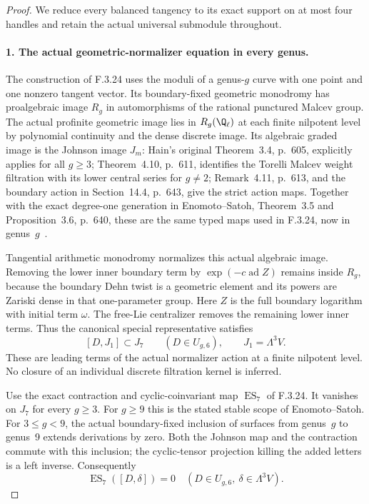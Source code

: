 \begin{proof}
We reduce every balanced tangency to its exact support on at most four handles and retain the actual universal submodule throughout.
\paragraph{1. The actual geometric-normalizer equation in every genus.}
The construction of F.3.24 uses the moduli of a genus-$g$
curve with one point and one nonzero tangent vector.
Its boundary-fixed geometric monodromy has proalgebraic
image $R_g$ in automorphisms of the rational punctured
Malcev group. The actual profinite geometric image lies
in $R_g(\Q_\ell)$ at each finite nilpotent level by
polynomial continuity and the dense discrete image.
Its algebraic graded image is the Johnson image $J_m$:
Hain's original Theorem~3.4, p.~605, explicitly applies
for all $g\geq3$; Theorem~4.10, p.~611, identifies
the Torelli Malcev weight filtration with its lower
central series for $g\ne2$; Remark~4.11, p.~613,
and the boundary action in Section~14.4, p.~643,
give the strict action maps. Together with the exact
degree-one generation in Enomoto--Satoh, Theorem~3.5
and Proposition~3.6, p.~640, these are the same
typed maps used in F.3.24, now in genus~$g$~\cite{AuditHain1997Torelli,AuditEnomotoSatoh2014}.

Tangential arithmetic monodromy normalizes this actual
algebraic image. Removing the lower inner boundary
term by $\exp(-c\operatorname{ad}Z)$ remains inside
$R_g$, because the boundary Dehn twist is a geometric
element and its powers are Zariski dense in that
one-parameter group. Here $Z$ is the full boundary
logarithm with initial term $\omega$. The free-Lie
centralizer removes the remaining lower inner terms.
Thus the canonical special representative satisfies
\[
       [D,J_1]\subset J_7\qquad(D\in U_{g,6}),
       \qquad J_1=\Lambda^3V.                              \tag{AG.2}
\]
These are leading terms of the actual normalizer
action at a finite nilpotent level. No closure of
an individual discrete filtration kernel is inferred.

Use the exact contraction and cyclic-coinvariant
map $\operatorname{ES}_7$ of F.3.24. It vanishes on
$J_7$ for every $g\geq3$. For $g\geq9$ this is
the stated stable scope of Enomoto--Satoh. For
$3\leq g<9$, the actual boundary-fixed inclusion
of surfaces from genus~$g$ to genus~9 extends
derivations by zero. Both the Johnson map and
the contraction commute with this inclusion;
the cyclic-tensor projection killing the added
letters is a left inverse. Consequently
\[
     \operatorname{ES}_7([D,\delta])=0
      \quad(D\in U_{g,6},\ \delta\in\Lambda^3V).           \tag{AG.3}
\]


\end{proof}
